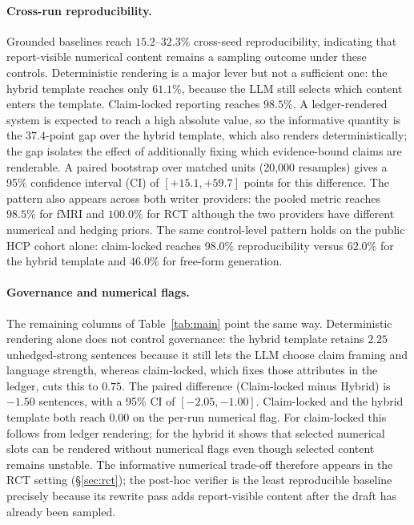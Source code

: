 \documentclass[10pt,twocolumn]{article}
\begin{document}
\paragraph{Cross-run reproducibility.} Grounded baselines reach $15.2$--$32.3\%$ cross-seed reproducibility, indicating that report-visible numerical content remains a sampling outcome under these controls. Deterministic rendering is a major lever but not a sufficient one: the hybrid template reaches only $61.1\%$, because the LLM still selects which content enters the template. Claim-locked reporting reaches $98.5\%$. A ledger-rendered system is expected to reach a high absolute value, so the informative quantity is the $37.4$-point gap over the hybrid template, which also renders deterministically; the gap isolates the effect of additionally fixing which evidence-bound claims are renderable. A paired bootstrap over matched units (20{,}000 resamples) gives a 95\% confidence interval (CI) of $[+15.1,+59.7]$ points for this difference. The pattern also appears across both writer providers: the pooled metric reaches $98.5\%$ for fMRI and $100.0\%$ for RCT although the two providers have different numerical and hedging priors. The same control-level pattern holds on the public HCP cohort alone: claim-locked reaches $98.0\%$ reproducibility versus $62.0\%$ for the hybrid template and $46.0\%$ for free-form generation.

\paragraph{Governance and numerical flags.} The remaining columns of Table~\ref{tab:main} point the same way. Deterministic rendering alone does not control governance: the hybrid template retains $2.25$ unhedged-strong sentences because it still lets the LLM choose claim framing and language strength, whereas claim-locked, which fixes those attributes in the ledger, cuts this to $0.75$. The paired difference (Claim-locked minus Hybrid) is $-1.50$ sentences, with a 95\% CI of $[-2.05,-1.00]$. Claim-locked and the hybrid template both reach $0.00$ on the per-run numerical flag. For claim-locked this follows from ledger rendering; for the hybrid it shows that selected numerical slots can be rendered without numerical flags even though selected content remains unstable. The informative numerical trade-off therefore appears in the RCT setting (\S\ref{sec:rct}); the post-hoc verifier is the least reproducible baseline precisely because its rewrite pass adds report-visible content after the draft has already been sampled.
\end{document}
